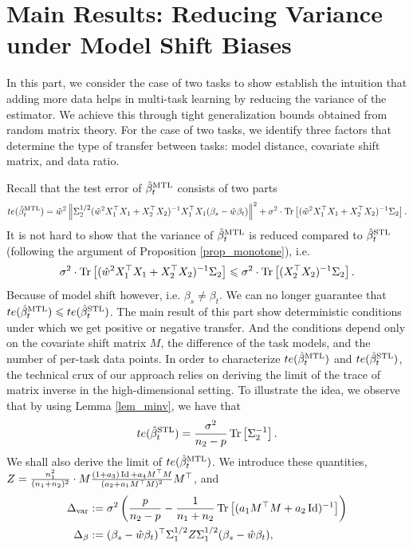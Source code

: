 \section{Main Results: Reducing Variance under Model Shift Biases}\label{sec_denoise}

In this part, we consider the case of two tasks to show  establish the intuition that adding more data helps in multi-task learning by reducing the variance of the estimator.
We achieve this through tight generalization bounds obtained from random matrix theory.
For the case of two tasks, we identify three factors that determine the type of transfer between tasks: model distance, covariate shift matrix, and data ratio.

Recall that the test error of $\hat{\beta}_{t}^{\text{MTL}}$ consists of two parts
\begin{align}
	te(\hat{\beta}_t^{\text{MTL}}) = \hat{w}^2 \left\| \Sigma_2^{1/2} (\hat{w}^2 X_1^{\top}X_1 + X_2^{\top}X_2)^{-1}X_1^{\top}X_1 (\beta_s - \hat{w}\beta_t) \right\|^2 + \sigma^2\cdot \operatorname{Tr}\left[(\hat{w}^2 X_1^{\top}X_1 + X_2^{\top}X_2)^{-1}\Sigma_2\right]. \label{eq_te_model_shift}
\end{align}
It is not hard to show that the variance of $\hat{\beta}_t^{\text{MTL}}$ is reduced compared to $\hat{\beta}_t^{\text{STL}}$ (following the argument of Proposition \ref{prop_monotone}), i.e.
\[ \sigma^2\cdot \operatorname{Tr}\left[(\hat{w}^2 X_1^{\top}X_1 + X_2^{\top}X_2)^{-1}\Sigma_2\right] \leqslant \sigma^2\cdot \operatorname{Tr}\left[(X_2^{\top}X_2)^{-1}\Sigma_2\right]. \]
Because of model shift however, i.e. $\beta_s \neq \beta_t$.
We can no longer guarantee that $te(\hat{\beta}_{t}^{\text{MTL}}) \leqslant te(\hat{\beta}_t^{\text{STL}})$.
The main result of this part show deterministic conditions under which we get positive or negative transfer.
And the conditions depend only on the covariate shift matrix $M$, the difference of the task models, and the number of per-task data points.
In order to characterize $te(\hat{\beta}_t^{\text{MTL}})$ and $te(\hat{\beta}_t^{\text{STL}})$, the technical crux of our approach relies on deriving the limit of the trace of matrix inverse in the high-dimensional setting.
To illustrate the idea, we observe that by using Lemma \ref{lem_minv}, we have that
\[ te(\hat{\beta}_t^{\text{STL}}) = \frac{\sigma^2}{n_2 - p}\operatorname{Tr}\left[\Sigma_2^{-1}\right]. \]
We shall also derive the limit of $te(\hat{\beta}_t^{\text{MTL}})$.
We introduce these quantities, $Z = \frac{n_1^2}{(n_1 + n_2)^2}\cdot{M} \frac{(1 + a_3)\operatorname{Id} + a_4 {M}^{\top}{M}}{(a_2 + a_1 {M}^{\top}{M})^2} {M}^{\top}$, and
	\begin{align*} %
		\Delta_{\vari} &\define {\sigma^2}\bigbrace{\frac{p}{n_2 - p} -  \frac{1}{n_1 + n_2} \bigtr{(a_1 M^{\top}M + a_2\id)^{-1}} } \\
		\Delta_{\beta} &\define (\beta_s - \hat{w}\beta_t)^{\top} \Sigma_1^{1/2} Z \Sigma_1^{1/2} (\beta_s - \hat{w}\beta_t),
	\end{align*}
